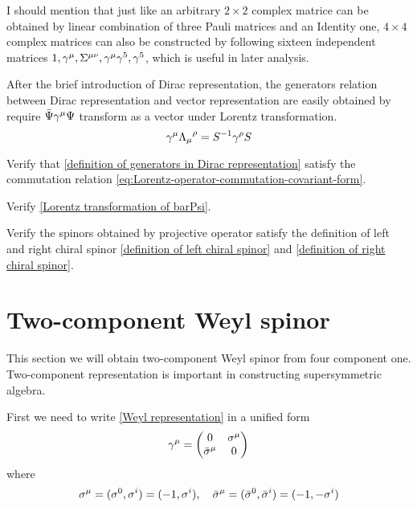 I should mention that just like an arbitrary $2\times2$ complex matrice can be obtained by linear combination of three Pauli matrices and an Identity one, $4\times4$ complex matrices can also be constructed by following sixteen independent matrices $1,\gamma^{\mu},\Sigma^{\mu\nu},\gamma^{\mu}\gamma^5,\gamma^5$, which is useful in later analysis.

After the brief introduction of Dirac representation, the generators relation between Dirac representation and vector representation are easily obtained by require $\bar{\Psi}\gamma^{\mu}\Psi$ transform as a vector under Lorentz transformation.
\begin{equation} \label{Lorentz transformation of gamma matrice}
\gamma^{\mu}{\Lambda_{\mu}}^{\rho}=S^{-1}\gamma^{\rho}S
\end{equation}

\begin{Exe}
Verify that \eqref{definition of generators in Dirac representation} satisfy the commutation relation \eqref{eq:Lorentz-operator-commutation-covariant-form}.
\end{Exe}
\begin{Exe}
Verify \eqref{Lorentz transformation of barPsi}.
\end{Exe}

\begin{Exe}
Verify the spinors obtained by projective operator satisfy the definition of left and right chiral spinor \eqref{definition of left chiral spinor} and
  \eqref{definition of right chiral spinor}.
\end{Exe}


\section{Two-component Weyl spinor}
This section we will obtain two-component Weyl spinor from four component one. Two-component representation is important in constructing supersymmetric algebra.

First we need to write \eqref{Weyl representation} in a unified form
\begin{equation} \label{unified form of gamma matrice}
\g^{\m} =\mqty( 0            & \s^{\m}\\
\bar{\s}^{\m}& 0     )
\end{equation}
where
\begin{equation}
  \sigma^{\mu} = (\sigma^0,\sigma^i) = (-1,\sigma^{i}),\quad
\bar{\sigma}^{\mu}=(\bar{\sigma}^0,\bar{\sigma}^i)=(-1,-\sigma^{i})
\end{equation}

